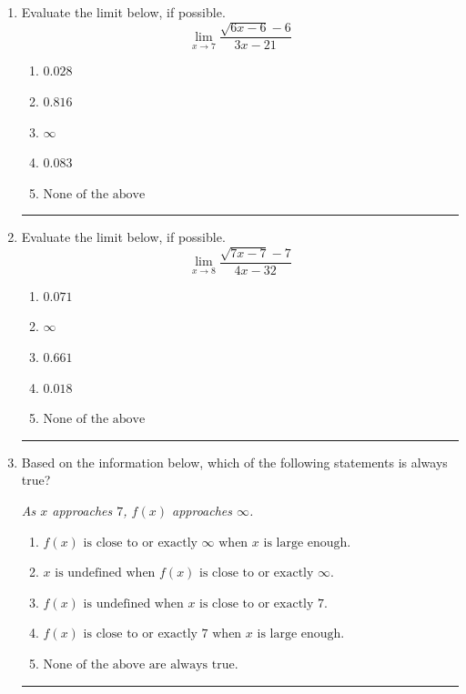 \documentclass[14pt]{extbook}
\newcommand{\litem}[1]{\item#1\hspace*{-1cm}\rule{\textwidth}{0.4pt}}
\begin{document}
\begin{enumerate}
{\begin{enumerate}[label=\Alph*.]
\end{enumerate} }
\litem{
Evaluate the limit below, if possible.\[ \lim_{x \rightarrow 7} \frac{\sqrt{6x - 6} - 6}{3x - 21} \]\begin{enumerate}[label=\Alph*.]
\item \( 0.028 \)
\item \( 0.816 \)
\item \( \infty \)
\item \( 0.083 \)
\item \( \text{None of the above} \)

\end{enumerate} }
\litem{
Evaluate the limit below, if possible.\[ \lim_{x \rightarrow 8} \frac{\sqrt{7x - 7} - 7}{4x - 32} \]\begin{enumerate}[label=\Alph*.]
\item \( 0.071 \)
\item \( \infty \)
\item \( 0.661 \)
\item \( 0.018 \)
\item \( \text{None of the above} \)

\end{enumerate} }
\litem{
Based on the information below, which of the following statements is always true?
\begin{center}
    \textit{ As $x$ approaches $7$, $f(x)$ approaches $\infty$. }
\end{center}
\begin{enumerate}[label=\Alph*.]
\item \( f(x) \text{ is close to or exactly } \infty \text{ when } x \text{ is large enough}. \)
\item \( x \text{ is undefined when } f(x) \text{ is close to or exactly } \infty. \)
\item \( f(x) \text{ is undefined when } x \text{ is close to or exactly } 7. \)
\item \( f(x) \text{ is close to or exactly } 7 \text{ when } x \text{ is large enough}. \)
\item \( \text{None of the above are always true.} \)


\end{enumerate}}
\end{enumerate}
\end{document}
